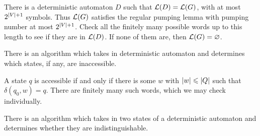 \documentclass{article}
\begin{document}
\begin{prf}
	There is a deterministic automaton $D$ such that $\mathcal{L}(D) = \mathcal{L}(G)$, with at most $2^{\left\lvert V \right\rvert+1}$ symbols. Thus $\mathcal{L}(G)$ satisfies the regular pumping lemma with pumping number at most $2^{\left\lvert V \right\rvert+1}$. Check all the finitely many possible words up to this length to see if they are in $\mathcal{L}(D)$. If none of them are, then $\mathcal{L}(G) = \varnothing$.
\end{prf}

\begin{proposition}
	There is an algorithm which takes in deterministic automaton and determines which states, if any, are inaccessible.
\end{proposition}

\begin{prf}
	A state $q$ is accessible if and only if there is some $w$ with $\left\lvert w \right\rvert \leqslant \left\lvert Q \right\rvert$ such that $\delta(q_0, w) = q$. There are finitely many such words, which we may check individually.
\end{prf}

\begin{proposition}
	There is an algorithm which takes in two states of a deterministic automaton and determines whether they are indistinguishable.
\end{proposition}
\end{document}
